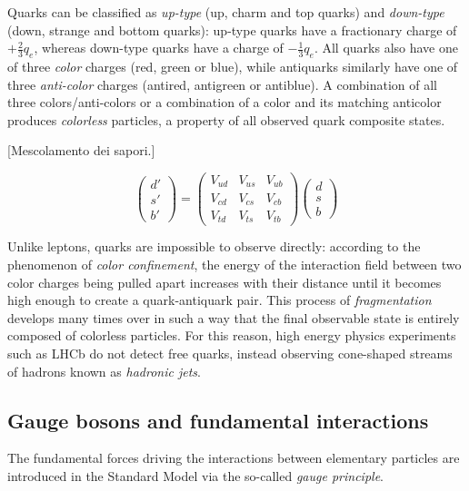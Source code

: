 Quarks can be classified as \textit{up-type} (up, charm and top quarks) and \textit{down-type} (down, strange and bottom quarks): up-type quarks have a fractionary charge of $+\frac{2}{3} q_e$, whereas down-type quarks have a charge of $-\frac{1}{3} q_e$. All quarks also have one of three \textit{color} charges (red, green or blue), while antiquarks similarly have one of three \textit{anti-color} charges (antired, antigreen or antiblue). A combination of all three colors/anti-colors or a combination of a color and its matching anticolor produces \textit{colorless} particles, a property of all observed quark composite states.

[Mescolamento dei sapori.]

\begin{equation}
	\begin{pmatrix}
		d' \\
		s' \\
		b'
	\end{pmatrix}
	=
	\begin{pmatrix}
		V_{ud} & V_{us} & V_{ub} \\
		V_{cd} & V_{cs} & V_{cb} \\
		V_{td} & V_{ts} & V_{tb}
	\end{pmatrix}
	\begin{pmatrix}
		d \\
		s \\
		b
	\end{pmatrix}
	\label{eq:CKM_matrix}
\end{equation}

Unlike leptons, quarks are impossible to observe directly: according to the phenomenon of \textit{color confinement}, the energy of the interaction field between two color charges being pulled apart increases with their distance until it becomes high enough to create a quark-antiquark pair.
This process of \textit{fragmentation} develops many times over in such a way that the final observable state is entirely composed of colorless particles.
For this reason, high energy physics experiments such as LHCb do not detect free quarks, instead observing cone-shaped streams of hadrons known as \textit{hadronic jets}.

\subsection{Gauge bosons and fundamental interactions}
The fundamental forces driving the interactions between elementary particles are introduced in the Standard Model via the so-called \textit{gauge principle}.

